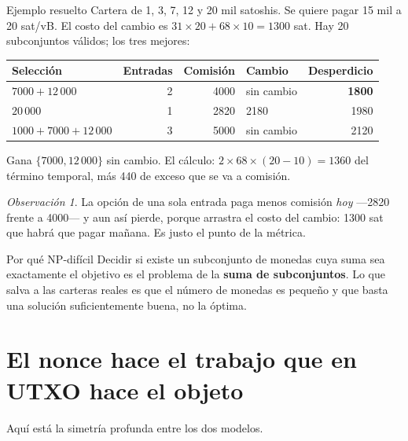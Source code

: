 \documentclass[11pt,a4paper]{article}
\theoremstyle{definition}
\theoremstyle{plain}
\theoremstyle{remark}
\newtheorem*{observacion}{Observación}
\begin{document}
\begin{laboratorio}{Ejemplo resuelto}
Cartera de 1, 3, 7, 12 y 20 mil satoshis. Se quiere pagar 15 mil a 20 sat/vB. El
costo del cambio es $31 \times 20 + 68 \times 10 = 1300$ sat. Hay 20 subconjuntos
válidos; los tres mejores:

\begin{center}
\small
\begin{tabular}{@{}lrrlr@{}}
\toprule
Selección & Entradas & Comisión & Cambio & Desperdicio \\
\midrule
$7000 + 12\,000$          & 2 & 4000 & sin cambio & \textbf{1800} \\
$20\,000$                 & 1 & 2820 & 2180       & 1980 \\
$1000 + 7000 + 12\,000$   & 3 & 5000 & sin cambio & 2120 \\
\bottomrule
\end{tabular}
\end{center}

Gana $\{7000, 12\,000\}$ sin cambio. El cálculo:
$2 \times 68 \times (20-10) = 1360$ del término temporal, más 440 de exceso que
se va a comisión.
\end{laboratorio}

\begin{observacion}
La opción de una sola entrada paga menos comisión \emph{hoy} —2820 frente a
4000— y aun así pierde, porque arrastra el costo del cambio: 1300 sat que habrá
que pagar mañana. Es justo el punto de la métrica.
\end{observacion}

\begin{aviso}{Por qué NP-difícil}
Decidir si existe un subconjunto de monedas cuya suma sea exactamente el objetivo
es el problema de la \textbf{suma de subconjuntos}. Lo que salva a las carteras
reales es que el número de monedas es pequeño y que basta una solución
suficientemente buena, no la óptima.
\end{aviso}

\section{El nonce hace el trabajo que en UTXO hace el objeto}\label{sec:nonce}

Aquí está la simetría profunda entre los dos modelos.
\end{document}
